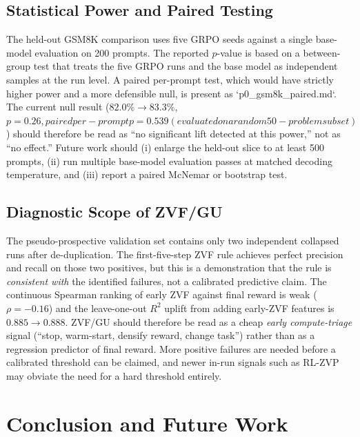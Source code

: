 \documentclass[12pt,a4paper]{report}
\begin{document}
\section*{Statistical Power and Paired Testing}
The held-out GSM8K comparison uses five GRPO seeds against a single base-model evaluation on 200 prompts. The reported $p$-value is based on a between-group test that treats the five GRPO runs and the base model as independent samples at the run level. A paired per-prompt test, which would have strictly higher power and a more defensible null, is present as `p0_gsm8k_paired.md`. The current null result ($82.0\%\to83.3\%$, $p=0.26, paired per-prompt p=0.539 (evaluated on a random 50-problem subset)$) should therefore be read as ``no significant lift detected at this power,'' not as ``no effect.'' Future work should (i) enlarge the held-out slice to at least 500 prompts, (ii) run multiple base-model evaluation passes at matched decoding temperature, and (iii) report a paired McNemar or bootstrap test.

\section*{Diagnostic Scope of ZVF/GU}
The pseudo-prospective validation set contains only two independent collapsed runs after de-duplication. The first-five-step ZVF rule achieves perfect precision and recall on those two positives, but this is a demonstration that the rule is \emph{consistent with} the identified failures, not a calibrated predictive claim. The continuous Spearman ranking of early ZVF against final reward is weak ($\rho=-0.16$) and the leave-one-out $R^2$ uplift from adding early-ZVF features is $0.885\!\to\!0.888$. ZVF/GU should therefore be read as a cheap \emph{early compute-triage} signal (``stop, warm-start, densify reward, change task'') rather than as a regression predictor of final reward. More positive failures are needed before a calibrated threshold can be claimed, and newer in-run signals such as RL-ZVP~\citep{liu2025rlzvp} may obviate the need for a hard threshold entirely.

\chapter{Conclusion and Future Work}
\label{ch:conclusion}
\end{document}
